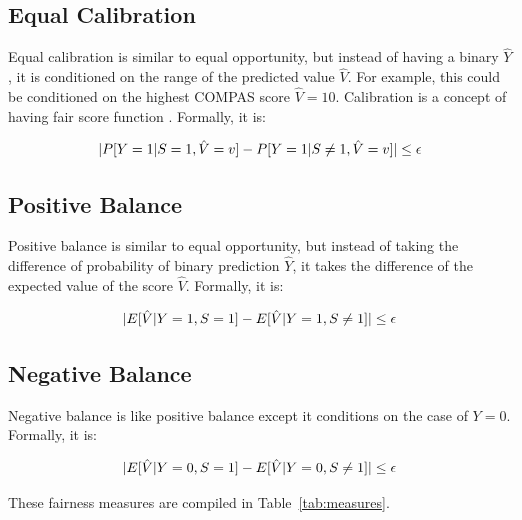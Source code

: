 \documentclass[conference]{IEEEtran}
\begin{document}
\subsection{Equal Calibration}
Equal calibration \cite{chouldechova2017fair} is similar to equal opportunity, but instead of having a binary $\hat{Y}$, it is conditioned on the range of the predicted value $\hat{V}$. For example, this could be conditioned on the highest COMPAS score $\hat{V} = 10$. Calibration is a concept of having fair score function \cite{fraenkel2020fairness}. Formally, it is:

\begin{align*}
    \lvert P[Y = 1 | S = 1, \hat{V} = v] - P[Y = 1 | S \neq 1, \hat{V} = v]\rvert \leq \epsilon
\end{align*}

\subsection{Positive Balance}
Positive balance \cite{kleinberg2016inherent} is similar to equal opportunity, but instead of taking the difference of probability of binary prediction $\hat{Y}$, it takes the difference of the expected value of the score $\hat{V}$. Formally, it is:

\begin{align*}
    \lvert E[\hat{V} | Y = 1, S = 1] - E[\hat{V} | Y = 1, S \neq 1]\rvert \leq \epsilon
\end{align*}

\subsection{Negative Balance}
Negative balance \cite{kleinberg2016inherent} is like positive balance except it conditions on the case of $Y = 0$. Formally, it is:

\begin{align*}
    \lvert E[\hat{V} | Y = 0, S = 1] - E[\hat{V} | Y = 0, S \neq 1]\rvert \leq \epsilon
\end{align*}

These fairness measures are compiled in Table~\ref{tab:measures}.
\end{document}
